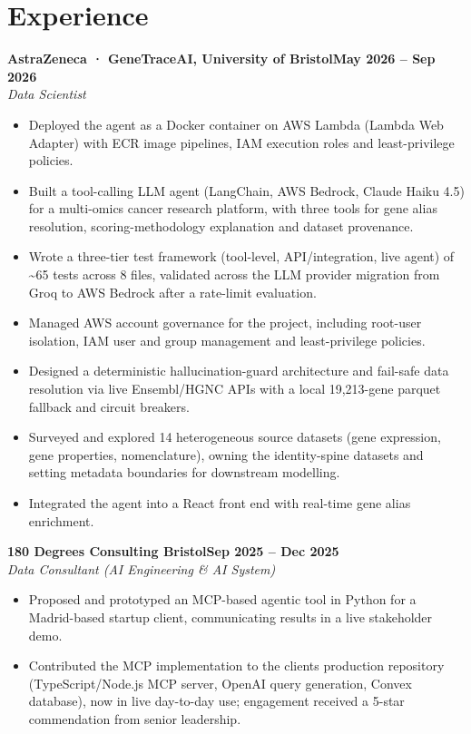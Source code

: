 \documentclass[a4paper,11pt]{article}
\newcommand{\entry}[4]{\needspace{4\baselineskip}\noindent\textbf{#1}\hfill\textbf{#2}\\ \textit{#3}\hfill\textit{#4}\par}
\begin{document}
\section{Experience}
\entry{AstraZeneca · GeneTraceAI, University of Bristol}{May 2026 – Sep 2026}{Data Scientist}{}
\begin{itemize}
  \item Deployed the agent as a Docker container on AWS Lambda (Lambda Web Adapter) with ECR image pipelines, IAM execution roles and least-privilege policies.
  \item Built a tool-calling LLM agent (LangChain, AWS Bedrock, Claude Haiku 4.5) for a multi-omics cancer research platform, with three tools for gene alias resolution, scoring-methodology explanation and dataset provenance.
  \item Wrote a three-tier test framework (tool-level, API/integration, live agent) of \textasciitilde{}65 tests across 8 files, validated across the LLM provider migration from Groq to AWS Bedrock after a rate-limit evaluation.
  \item Managed AWS account governance for the project, including root-user isolation, IAM user and group management and least-privilege policies.
  \item Designed a deterministic hallucination-guard architecture and fail-safe data resolution via live Ensembl/HGNC APIs with a local 19,213-gene parquet fallback and circuit breakers.
  \item Surveyed and explored 14 heterogeneous source datasets (gene expression, gene properties, nomenclature), owning the identity-spine datasets and setting metadata boundaries for downstream modelling.
  \item Integrated the agent into a React front end with real-time gene alias enrichment.
\end{itemize}
\vspace{4pt}
\entry{180 Degrees Consulting Bristol}{Sep 2025 – Dec 2025}{Data Consultant (AI Engineering \& AI System)}{}
\begin{itemize}
  \item Proposed and prototyped an MCP-based agentic tool in Python for a Madrid-based startup client, communicating results in a live stakeholder demo.
  \item Contributed the MCP implementation to the client\textquotesingle{}s production repository (TypeScript/Node.js MCP server, OpenAI query generation, Convex database), now in live day-to-day use; engagement received a 5-star commendation from senior leadership.
\end{itemize}
\end{document}
